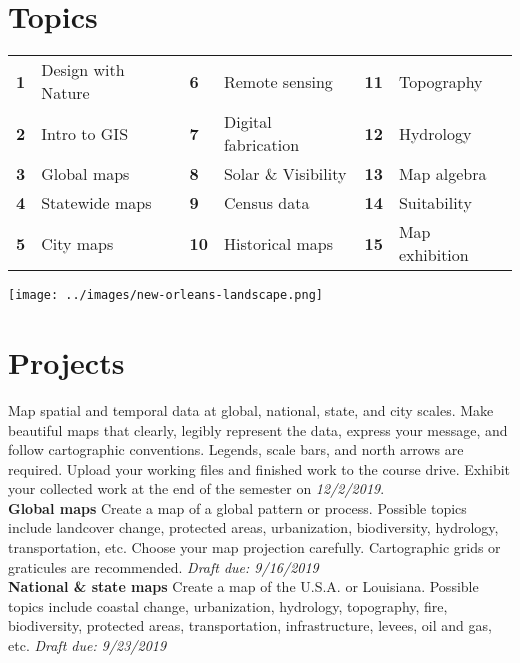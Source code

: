 \documentclass[11pt,article,oneside]{memoir}
\begin{document}
\section{Topics}
%
\begin{table}[H]
\begin{tabular}{l l @{\hskip 0.5cm} l l @{\hskip 0.5cm} l l}
\small
\textbf{1} & Design with Nature & \textbf{6} & Remote sensing & \textbf{11} & Topography\\
\textbf{2} & Intro to GIS & \textbf{7} & Digital fabrication & \textbf{12} & Hydrology\\
\textbf{3} & Global maps & \textbf{8} & Solar \& Visibility & \textbf{13} & Map algebra\\
\textbf{4} & Statewide maps & \textbf{9} & Census data & \textbf{14} & Suitability\\
\textbf{5} & City maps & \textbf{10} & Historical maps & \textbf{15} & Map exhibition\\
\end{tabular}
\end{table}

\vspace*{1em}

\texttt{[image: ../images/new-orleans-landscape.png]}

\clearpage

\section{Projects}
Map spatial and temporal data
at global, national, state, and city scales.
Make beautiful maps that 
clearly, legibly represent the data,
express your message, and
follow cartographic conventions.
Legends, scale bars, and north arrows are required.
Upload your working files and finished work to the course drive.
Exhibit your collected work at the end of the semester on
\emph{12/2/2019}.\\

\noindent \textbf{Global maps}
Create a map of a global pattern or process. 
Possible topics include landcover change, protected areas,
urbanization, biodiversity, hydrology, transportation, etc.
Choose your map projection carefully.
Cartographic grids or graticules are recommended.
\emph{Draft due: 9/16/2019}\\

\noindent \textbf{National \& state maps}
Create a map of the U.S.A. or Louisiana.
Possible topics include coastal change, urbanization, hydrology, topography, fire,
biodiversity, protected areas, transportation, infrastructure, levees, oil and gas, etc.
\emph{Draft due: 9/23/2019}\\
\end{document}
